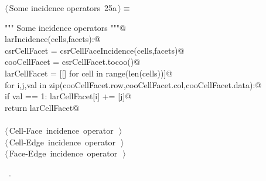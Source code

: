\documentclass[11pt,oneside]{article}    %
\begin{document}
\begin{flushleft} \small \label{scrap39}
\protect{}$\langle\,$Some incidence operators\nobreak\ {\footnotesize 25a}$\,\rangle\equiv$
\vspace{-1ex}
\begin{list}{}{} \item
\mbox{}\verb@""" Some incidence operators """@\\
\mbox{}\verb@def larIncidence(cells,facets):@\\
\mbox{}\verb@    csrCellFacet = csrCellFaceIncidence(cells,facets)@\\
\mbox{}\verb@    cooCellFacet = csrCellFacet.tocoo()@\\
\mbox{}\verb@    larCellFacet = [[] for cell in range(len(cells))]@\\
\mbox{}\verb@    for i,j,val in zip(cooCellFacet.row,cooCellFacet.col,cooCellFacet.data):@\\
\mbox{}\verb@        if val == 1: larCellFacet[i] += [j]@\\
\mbox{}\verb@    return larCellFacet@\\
\mbox{}\verb@@\\
\mbox{}\verb@@\hbox{$\langle\,$Cell-Face incidence operator\nobreak\ {\footnotesize {}}$\,\rangle$}\verb@@\\
\mbox{}\verb@@\hbox{$\langle\,$Cell-Edge incidence operator\nobreak\ {\footnotesize {}}$\,\rangle$}\verb@@\\
\mbox{}\verb@@\hbox{$\langle\,$Face-Edge incidence operator\nobreak\ {\footnotesize {}}$\,\rangle$}\verb@@\\
\mbox{}\verb@@{\NWsep}
\end{list}
\vspace{-1ex}
\footnotesize\addtolength{\baselineskip}{-1ex}
\begin{list}{}{\setlength{\itemsep}{-\parsep}\setlength{\itemindent}{-\leftmargin}}
\item \NWtxtMacroRefIn\ .
\end{list}
\end{flushleft}
\end{document}
